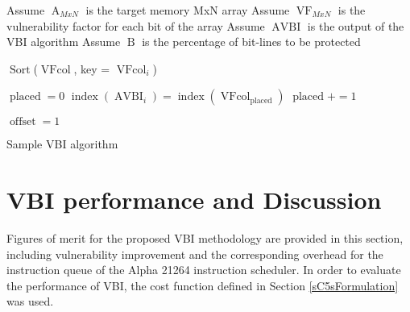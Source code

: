 \documentclass[12pt]{yalephd}
\begin{document}
\begin{algorithm}[!ht]


Assume $\operatorname{A}_{MxN}$ is the target memory MxN array\;
Assume $\operatorname{VF}_{MxN}$ is the vulnerability factor for each bit of the array\;
Assume $\operatorname{AVBI}$ is the output of the VBI algorithm\;
Assume $\operatorname{B}$ is the percentage of bit-lines to be protected\;

{}

$\operatorname{Sort}$($\operatorname{VFcol}$, key = $\operatorname{VFcol}_{i}$)\;


$\operatorname{placed} = 0$\;
 {
		$\operatorname{index}(\operatorname{AVBI}_i) = \operatorname{index}(\operatorname{VFcol}_{\operatorname{placed}})$\;
		$\operatorname{placed} += 1$\;
}


$\operatorname{offset} = 1$\;

\caption{Sample VBI algorithm}
\label{sC5aVBI}
\end{algorithm}

\section{VBI performance and Discussion}\label{sC5vsResults}

Figures of merit for the proposed VBI methodology are provided in this section, including vulnerability improvement and the corresponding overhead for the instruction queue of the Alpha 21264 instruction scheduler. In order to evaluate the performance of VBI, the cost function defined in Section \ref{sC5sFormulation} was used.
\end{document}
